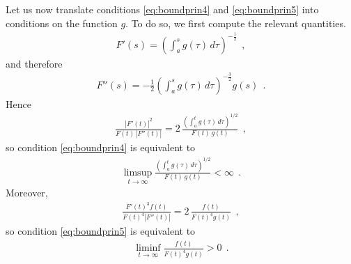 \documentclass[a4paper,11pt,openright,twoside]{book}
\newcommand{\1}{\mathds{1}}
\theoremstyle{plain}
\theoremstyle{definition}
\theoremstyle{remark}
\begin{document}
Let us now translate conditions \eqref{eq:boundprin4} and \eqref{eq:boundprin5} into conditions on the function $g$. To do so, we first compute the relevant quantities.
\begin{align*}
	F'(s) = \left( \int_a^s g(\tau)\,d\tau \right)^{-\frac{1}{2}}
	\ \ ,
\end{align*}
and therefore
\begin{align*}
	F''(s) = -\frac{1}{2} \left( \int_a^s g(\tau)\,d\tau \right)^{-\frac{3}{2}} g(s)
	\ \ .
\end{align*}
Hence
\begin{align*}
	\frac{|F'(t)|^2}{F(t)\,|F''(t)|}
	=
	2\,\frac{\left(\int_a^t g(\tau)\,d\tau\right)^{1/2}}{F(t)\,g(t)}
	\ \ ,
\end{align*}
so condition \eqref{eq:boundprin4} is equivalent to
\begin{align*}
	\limsup_{t\to\infty}
	\frac{\left(\displaystyle\int_a^t g(\tau)\,d\tau\right)^{1/2}}{F(t)\,g(t)}
	<\infty
	\ \ .
\end{align*}
Moreover,
\begin{align*}
	\frac{F'(t)^3 f(t)}{F(t)^4 |F''(t)|}
	=
	2\,\frac{f(t)}{F(t)^4 g(t)}
	\ \ ,
\end{align*}
so condition \eqref{eq:boundprin5} is equivalent to
\begin{align*}
	\liminf_{t\to\infty}\frac{f(t)}{F(t)^4 g(t)} > 0
	\ \ .
\end{align*}
\end{document}
